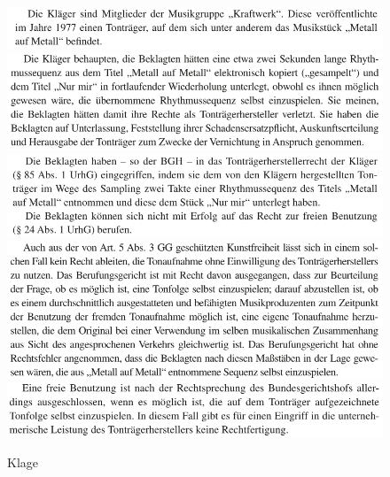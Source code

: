 \documentclass[a4paper, 11pt]{article}
\begin{document}
\begin{figure}
\centering
\includegraphics[width=1\textwidth]{../klaeger0.png}
\includegraphics[width=1\textwidth]{../klage0.png}
\includegraphics[width=1\textwidth]{../rechtAufFreieNutzung.png}
\includegraphics[width=1\textwidth]{../kuenstlFreiheit.png}
\includegraphics[width=1\textwidth]{../moeglichkeitSelbsteinspielung.png}
    \caption{Klage}
\label{img:Klage}
\end{figure}
\end{document}
